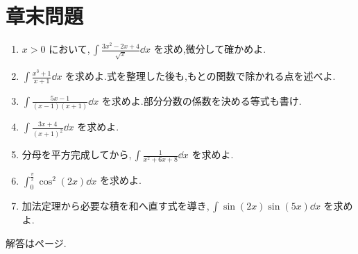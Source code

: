 \section*{章末問題}
\begin{enumerate}[label=\textbf{\thechapter.\arabic*},leftmargin=*]
 \item\label{問:基本べき} $x>0$ において,\,$\int\frac{3x^2-2x+4}{\sqrt{x}}\dd x$ を求め,微分して確かめよ.
 \item\label{問:基本割算} $\int\frac{x^3+1}{x+1}\dd x$ を求めよ.式を整理した後も,もとの関数で除かれる点を述べよ.
 \item\label{問:基本部分分数} $\int\frac{5x-1}{(x-1)(x+1)}\dd x$ を求めよ.部分分数の係数を決める等式も書け.
 \item\label{問:基本重因子} $\int\frac{3x+4}{(x+1)^2}\dd x$ を求めよ.
 \item\label{問:基本平方完成} 分母を平方完成してから,\,$\int\frac1{x^2+6x+8}\dd x$ を求めよ.
 \item\label{問:基本三角二乗} $\int_0^{\frac\pi2}\cos^2(2x)\dd x$ を求めよ.
 \item\label{問:基本三角積} 加法定理から必要な積を和へ直す式を導き,\,$\int\sin(2x)\sin(5x)\dd x$ を求めよ.
\end{enumerate}

\smallskip\noindent 解答は\pageref{解答:第5章}ページ.

